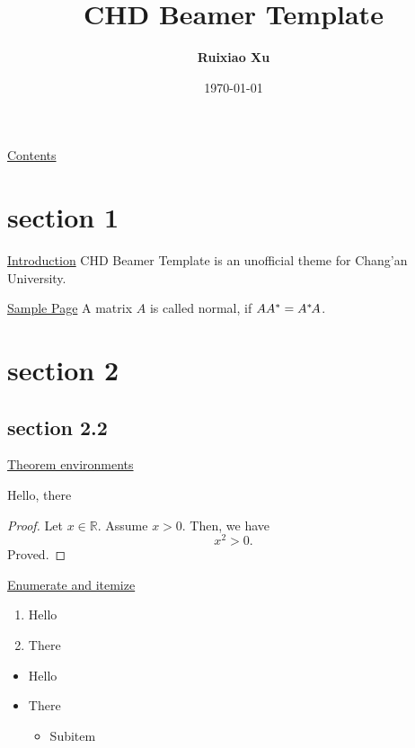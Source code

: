 \documentclass[11pt,aspectratio=43,xcolor={dvipsnames},hyperref={pdftex,pdfpagemode=UseNone,hidelinks,pdfdisplaydoctitle=true},usepdftitle=false]{ctexbeamer}
\title{CHD Beamer Template}
\author{\textbf{Ruixiao Xu}}
\institute{School of Information Engineering\\Chang'an University}
\date{\today}
\begin{document}
\begin{frame}
  \maketitle
\end{frame}

\begin{frame}{\underline{Contents}}
  \tableofcontents
\end{frame}

\section{section 1}
\begin{frame}{\underline{Introduction}}
  \alert{CHD Beamer Template} is an unofficial theme for Chang'an University.
\end{frame}

\begin{frame}{\underline{Sample Page}}
  A matrix $A$ is called normal, if $AA^*=A^*\mskip-2muA$.
\end{frame}

\section{section 2}
\subsection{section 2.2}
\begin{frame}{\underline{Theorem environments}}

  \begin{theorem}
    Hello, there
  \end{theorem}

  \begin{proof}
    Let $x \in \mathbb{R}$. Assume $x > 0$. Then, we have
    \begin{equation}
      x^2 > 0.
    \end{equation}
    Proved.
  \end{proof}
\end{frame}

\begin{frame}{\underline{Enumerate and itemize}}
  \begin{enumerate}
    \item Hello
    \item There
  \end{enumerate}
  \begin{itemize}
    \item Hello
    \item There
          \begin{itemize}
            \item Subitem
          \end{itemize}
  \end{itemize}
\end{frame}
\end{document}
